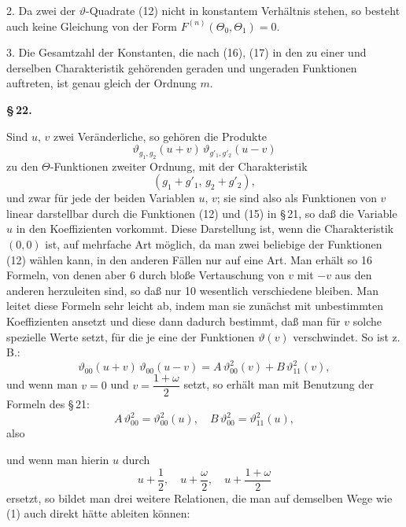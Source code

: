 
2. Da zwei der $\vartheta$-Quadrate (12) nicht in konstantem Verhältnis stehen, so besteht auch keine Gleichung von der Form $F^{(n)}(\Theta_0,\Theta_1) = 0$.

3. Die Gesamtzahl der Konstanten, die nach (16), (17) in den zu einer und derselben Charakteristik gehörenden geraden und ungeraden Funktionen auftreten, ist genau gleich der Ordnung $m$.

\begin{center}
\textbf{\S\,22. }
\end{center}

Sind $u$, $v$ zwei Veränderliche, so gehören die Produkte
\[
\vartheta_{g_1,g_2}(u+v)\,\vartheta_{g'_1,g'_2}(u-v)
\]
zu den $\Theta$-Funktionen zweiter Ordnung, mit der Charakteristik
\[
(g_1+g'_1,\,g_2+g'_2),
\]
und zwar für jede der beiden Variablen $u$, $v$; sie sind also als Funktionen von $v$ linear darstellbar durch die Funktionen (12) und (15) in \S\,21, so daß die Variable $u$ in den Koeffizienten vorkommt. Diese Darstellung ist, wenn die Charakteristik $(0,0)$ ist, auf mehrfache Art möglich, da man zwei beliebige der Funktionen (12) wählen kann, in den anderen Fällen nur auf eine Art. Man erhält so 16 Formeln, von denen aber 6 durch bloße Vertauschung von $v$ mit $-v$ aus den anderen herzuleiten sind, so daß nur 10 wesentlich verschiedene bleiben. Man leitet diese Formeln sehr leicht ab, indem man sie zunächst mit unbestimmten Koeffizienten ansetzt und diese dann dadurch bestimmt, daß man für $v$ solche spezielle Werte setzt, für die je eine der Funktionen $\vartheta(v)$ verschwindet. So ist z.\,B.:
\[
\vartheta_{00}(u+v)\,\vartheta_{00}(u-v) = A\,\vartheta_{00}^2(v) + B\,\vartheta_{11}^2(v),
\]
und wenn man $v=0$ und $v=\dfrac{1+\omega}{2}$ setzt, so erhält man mit Benutzung der Formeln des \S\,21:
\[
A\,\vartheta_{00}^2 = \vartheta_{00}^2(u), \quad B\,\vartheta_{00}^2 = \vartheta_{11}^2(u),
\]
also

und wenn man hierin $u$ durch
\[
u+\frac{1}{2}, \quad u+\frac{\omega}{2}, \quad u+\frac{1+\omega}{2}
\]
ersetzt, so bildet man drei weitere Relationen, die man auf demselben Wege wie (1) auch direkt hätte ableiten können:
